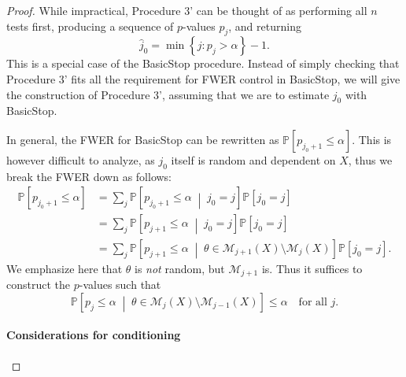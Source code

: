 \documentclass[11pt]{article}
\theoremstyle{definition}
\theoremstyle{custom}
\newcommand{\PP}{\mathbb{P}}
\begin{document}
\begin{proof}
While impractical, Procedure 3' can be thought of as performing all $n$ tests first, producing a sequence of $p$-values $p_j$, and returning
\begin{equation}
\hat{j}_0 = \min\left\{j: p_j > \alpha\right\} - 1.
\label{eq:basicstop}
\end{equation}
This is a special case of the BasicStop procedure. Instead of simply checking that Procedure 3' fits all the requirement for FWER control in BasicStop, we will give the construction of Procedure 3', assuming that we are to estimate $j_0$ with BasicStop.

In general, the FWER for BasicStop can be rewritten as $\PP\left[p_{j_0+1} \le \alpha\right]$. This is however difficult to analyze, as $j_0$ itself is random and dependent on $X$, thus we break the FWER down as follows:
\begin{align*}
\PP\left[p_{j_0+1} \le \alpha\right] & = \sum_j \PP\left[p_{j_0+1} \le \alpha \;\middle|\; j_0 = j\right] \PP\left[j_0 = j\right] \\
& = \sum_j \PP\left[p_{j+1} \le \alpha \;\middle|\; j_0 = j\right] \PP\left[j_0 = j\right] \\
& = \sum_j \PP\left[p_{j+1} \le \alpha \;\middle|\; \theta \in \mathcal{M}_{j+1}\left(X\right) \setminus \mathcal{M}_j\left(X\right)\right] \PP\left[j_0 = j\right].
\end{align*}
We emphasize here that $\theta$ is {\em not} random, but $\mathcal{M}_{j+1}$ is. Thus it suffices to construct the $p$-values such that
\begin{equation}
\PP\left[p_j \le \alpha \;\middle|\; \theta \in \mathcal{M}_j\left(X\right) \setminus \mathcal{M}_{j-1}\left(X\right)\right] \le \alpha \quad \text{for all } j.
\label{eq:basicstopreq}
\end{equation}

\paragraph{Considerations for conditioning}


\end{proof}
\end{document}
